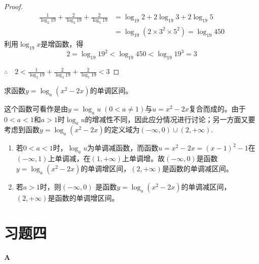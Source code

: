 \begin{proof}
\[\begin{split}
    \frac{1}{\log_2 19}+\frac{2}{\log_3 19}+\frac{2}{\log_5 19}&=\log_{19}2+2\log_{19}3+2\log_{19}5\\
    &=\log_{19}(2\times 3^2\times 5^2)=\log_{19}450
\end{split} \]
利用$\log_{19}x$是增函数，得
\[2=\log_{19}19^2<\log_{19}450<\log_{19}19^3=3\]

$\therefore\quad 2<\frac{1}{\log_2 19}+\frac{2}{\log_3 19}+\frac{2}{\log_5 19}<3$
\end{proof}

\begin{example}
求函数$y=\log_a(x^2-2x)$的单调区间。
\end{example}

\begin{analyze}
这个函数可看作是由$y=\log_a u\; (0<a\ne 1)$与$u=x^2-2x$复合而成的。由于$0<a<1$和$a>1$时$\log_a u$的增减性不同，因此应分情况进行讨论；另一方面又要考虑到函数$y=\log_a(x^2-2x)$的定义域为$(-\infty,0)\cup (2,+\infty)$.
\end{analyze}

\begin{solution}
\begin{enumerate}[(1)]
    \item 若$0<a<1$时，$\log_{a}u$为单调减函数，而函数$u=x^2-2x=(x-1)^2-1$在$(-\infty,1)$上单调减，在$(1,+\infty)$上单调增。故$(-\infty,0)$是函数$y=\log_{a}(x^{2}-2x)$的单调增区间，$(2,+\infty)$是函数的单调减区间。
    \item 若$a>1$时，则$(-\infty,0)$ 是函数$y=\log_a(x^2-2x)$的单调减区间，$(2,+\infty)$是函数的单调增区间。
\end{enumerate}
\end{solution}

\section*{习题四}
\begin{center}
    \bfseries A
\end{center}

